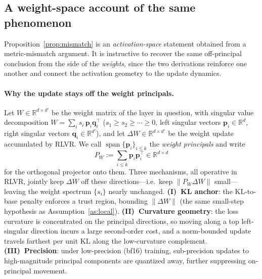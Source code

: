 \documentclass[11pt]{article}
\newcommand{\R}{\mathbb{R}}
\newcommand{\bp}{\mathbf{p}}
\newcommand{\bq}{\mathbf{q}}
\newcommand{\PW}{P_W}                 %
\begin{document}
\subsection{A weight-space account of the same phenomenon}
Proposition~\ref{prop:mismatch} is an \emph{activation-space} statement obtained from a
metric-mismatch argument. It is instructive to recover the same off-principal conclusion from the
side of the \emph{weights}, since the two derivations reinforce one another and connect the
activation geometry to the update dynamics.

\paragraph{Why the update stays off the weight principals.}
Let $W\in\R^{d\times d'}$ be the weight matrix of the layer in question, with singular value
decomposition $W=\sum_{i} s_i\,\bp_i\bq_i^\top$ ($s_1\ge s_2\ge\cdots\ge0$, left singular vectors
$\bp_i\in\R^{d}$, right singular vectors $\bq_i\in\R^{d'}$), and let $\Delta W\in\R^{d\times d'}$ be
the weight update accumulated by RLVR. We call $\operatorname{span}\{\bp_i\}_{i\le k}$ the
\emph{weight principals} and write
\begin{equation*}
\PW:=\sum_{i\le k}\bp_i\bp_i^\top\in\R^{d\times d}
\end{equation*}
for the orthogonal projector onto them. Three mechanisms, all operative in RLVR, jointly keep
$\Delta W$ off these directions---i.e.\ keep $\|\PW\Delta W\|$ small---leaving the weight spectrum
$\{s_i\}$ nearly unchanged. \textbf{(I)~KL anchor}: the KL-to-base penalty enforces a trust region,
bounding $\|\Delta W\|$ (the same small-step hypothesis as Assumption~\ref{as:local}).
\textbf{(II)~Curvature geometry}: the loss curvature is concentrated on the principal directions, so
moving along a top left-singular direction incurs a large second-order cost, and a norm-bounded
update travels farthest per unit KL along the low-curvature complement. \textbf{(III)~Precision}:
under low-precision (bf16) training, sub-precision updates to high-magnitude principal components
are quantized away, further suppressing on-principal movement.
\end{document}
